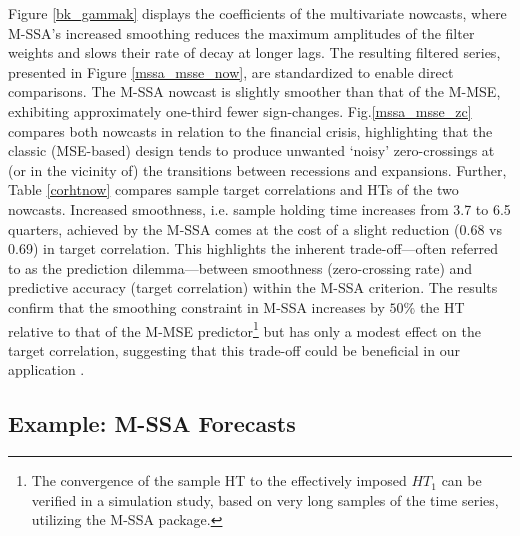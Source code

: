 \documentclass[11pt,a4paper]{article}
\begin{document}
Figure \ref{bk_gammak} displays the coefficients of the multivariate nowcasts, where M-SSA's increased smoothing reduces the maximum amplitudes of the filter weights and slows their rate of decay at longer lags. The resulting filtered series, presented in Figure \ref{mssa_msse_now}, are standardized to enable direct comparisons. The M-SSA nowcast is slightly smoother than that of the M-MSE, exhibiting approximately one-third fewer sign-changes. Fig.\ref{mssa_msse_zc} compares both nowcasts in relation to the financial crisis, highlighting that the classic (MSE-based) design tends to produce unwanted `noisy' zero-crossings at (or in the vicinity of) the transitions between recessions and expansions. Further, Table \ref{corhtnow} compares sample target correlations and HTs of the two nowcasts. Increased smoothness, i.e. sample holding time increases from 3.7 to 6.5 quarters, achieved by the M-SSA comes at the cost of a slight reduction (0.68 vs 0.69) in target correlation. This highlights the inherent trade-off—often referred to as the prediction dilemma—between smoothness (zero-crossing rate) and predictive accuracy (target correlation) within the M-SSA criterion. 
The results confirm that the smoothing constraint in M-SSA
increases by $50\%$ the HT relative to that of the M-MSE predictor\footnote{The convergence of the sample HT to the effectively imposed $HT_1$  can be verified in a simulation study, based on  very long samples of the time series, utilizing the M-SSA package.} but has only a modest effect on the target correlation, suggesting that this trade-off could be beneficial in our application
. %


\subsection{Example: M-SSA Forecasts}
\end{document}
